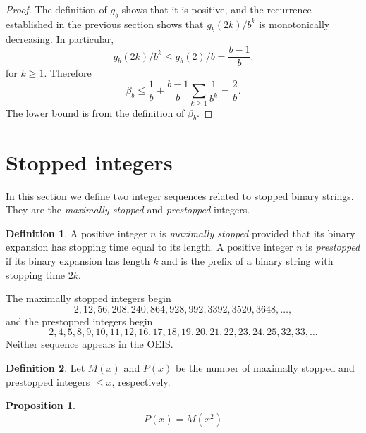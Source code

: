 \documentclass[12pt]{amsart}
\newtheorem{proposition}{Proposition}
\theoremstyle{definition}
\newtheorem{definition}{Definition}
\begin{document}
\begin{proof}
    The definition of $g_b$ shows that it is positive, and the recurrence
    established in the previous section shows that $g_b(2k) / b^k$ is
    monotonically decreasing. In particular,
    \begin{equation*}
        g_b(2k) / b^k \leq g_b(2) / b = \frac{b - 1}{b}.
    \end{equation*}
    for $k \geq 1$. Therefore
    \begin{equation*}
        \beta_b \leq \frac{1}{b} + \frac{b - 1}{b} \sum_{k \geq 1} \frac{1}{b^k}
        = \frac{2}{b}.
    \end{equation*}
    The lower bound is from the definition of $\beta_b$.
\end{proof}

\section{Stopped integers}
\label{sec:integers}

In this section we define two integer sequences related to stopped binary
strings. They are the \emph{maximally stopped} and \emph{prestopped} integers.

\begin{definition}
    A positive integer $n$ is \emph{maximally stopped} provided that its binary
    expansion has stopping time equal to its length. A positive integer $n$ is
    \emph{prestopped} if its binary expansion has length $k$ and is the prefix
    of a binary string with stopping time $2k$.
\end{definition}

The maximally stopped integers begin
\begin{equation*}
    2, 12, 56, 208, 240, 864, 928, 992, 3392, 3520, 3648, \dots,
\end{equation*}
and the prestopped integers begin
\begin{equation*}
    2, 4, 5, 8, 9, 10, 11, 12, 16, 17, 18, 19, 20, 21, 22, 23, 24, 25, 32, 33, \dots
\end{equation*}
Neither sequence appears in the OEIS.

\begin{definition}
    Let $M(x)$ and $P(x)$ be the number of maximally stopped and prestopped
    integers $\leq x$, respectively.
\end{definition}

\begin{proposition}
    \begin{equation*}
        P(x) = M(x^2)
    \end{equation*}
\end{proposition}
\end{document}
